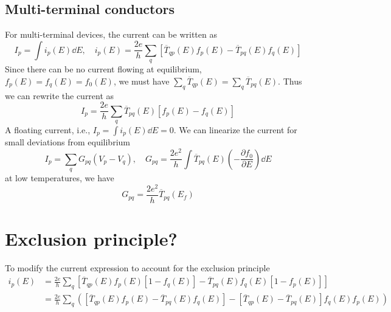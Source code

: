 \documentclass[11pt,a4paper]{book}
\theoremstyle{plain}
\theoremstyle{definition}
\theoremstyle{remark}
\begin{document}
\subsection{Multi-terminal conductors}
For multi-terminal devices, the current can be written as
\begin{equation}
    I_p = \int i_p(E) \dd E, \quad i_p(E) = \frac{2 e}{h} \sum_q \left[ \overline{T}_{qp}(E) f_p(E) - \overline{T}_{pq}(E) f_q(E) \right]
\end{equation}
Since there can be no current flowing at equilibrium, $f_p(E) = f_q(E) = f_0(E)$, we must have $\sum_q \overline{T}_{qp}(E) = \sum_q \overline{T}_{pq}(E)$. Thus we can rewrite the current as
\begin{equation}
    I_p = \frac{2 e}{h} \sum_q \overline{T}_{pq}(E) \left[ f_p(E) - f_q(E) \right]
\end{equation}
A floating current, i.e., $I_p = \int i_p(E) \dd E = 0$. We can linearize the current for small deviations from equilibrium
\begin{equation}
    I_p = \sum_q G_{pq} (V_p - V_q), \quad G_{pq} = \frac{2 e^2}{h} \int \overline{T}_{pq}(E) \left( -\frac{\partial f_0}{\partial E} \right) \dd E
\end{equation}
at low temperatures, we have
\begin{equation}
    G_{pq} = \frac{2 e^2}{h} \overline{T}_{pq}(E_f)
\end{equation}
\section{Exclusion principle?}
To modify the current expression to account for the exclusion principle
\begin{equation}
    \begin{aligned}
        i_p(E) 
        & = \frac{2 e}{h} \sum_q \left[ \overline{T}_{qp}(E) f_p(E) [1 - f_q(E)] - \overline{T}_{pq}(E) f_q(E) [1 - f_p(E)] \right] \\
        & = \frac{2 e}{h} \sum_q \left(\left[ \overline{T}_{qp}(E) f_p(E) - \overline{T}_{pq}(E) f_q(E) \right] - \left[ \overline{T}_{qp}(E) - \overline{T}_{pq}(E) \right]  f_q(E) f_p(E) \right)
    \end{aligned}
\end{equation}
\end{document}
